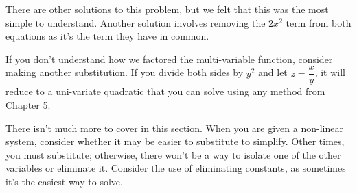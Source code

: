 \documentclass[lang=en,11pt]{elegantbook}
\begin{document}
\begin{remark}
There are other solutions to this problem, but we felt that this was the most simple to understand.  Another solution involves removing the $2x^2$ term from both equations as it's the term they have in common.
\end{remark}

If you don't understand how we factored the multi-variable function, consider making another substitution.  If you divide both sides by $y^2$ and let $z=\dfrac{x}{y}$, it will reduce to a uni-variate quadratic that you can solve using any method from \hyperlink{chapter.5}{Chapter 5}.

There isn't much more to cover in this section.  When you are given a non-linear system, consider whether it may be easier to substitute to simplify.  Other times, you must substitute; otherwise, there won't be a way to isolate one of the other variables or eliminate it.  Consider the use of eliminating constants, as sometimes it's the easiest way to solve.  
\end{document}
